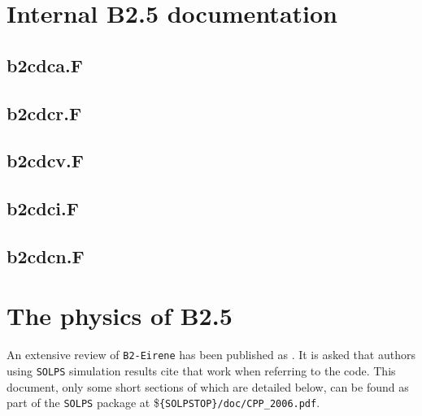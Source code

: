 \documentclass[a4paper,10pt]{report}
\begin{document}
\appendix

\chapter{Internal B2.5 documentation}
\label{cha:intb2doc}

\section{b2cdca.F}
\label{lis:b2cdca}


\newpage
\section{b2cdcr.F}
\label{lis:b2cdcr}


\newpage
\section{b2cdcv.F}
\label{lis:b2cdcv}


\newpage
\section{b2cdci.F}
\label{lis:b2cdci}


\newpage
\section{b2cdcn.F}
\label{lis:b2cdcn}


\chapter{The physics of B2.5}
\label{cha:b2physics}

An extensive review of {\tt B2-Eirene} has been published as \cite{SOLPS2006}.
It is asked that authors using {\tt SOLPS} simulation results cite that work when
referring to the code. This document, only some short sections of which are detailed
below, can be found as part of the {\tt SOLPS} package at \${\tt \{SOLPSTOP\}/doc/CPP\_2006.pdf}.
\end{document}
